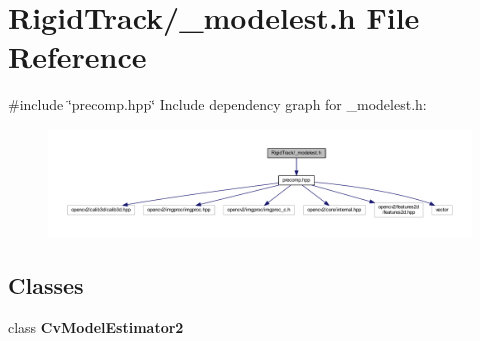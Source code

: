 \section{Rigid\+Track/\+\_\+modelest.h File Reference}
\label{__modelest_8h}
{\ttfamily \#include \char`\"{}precomp.\+hpp\char`\"{}}\newline
Include dependency graph for \+\_\+modelest.\+h\+:\nopagebreak
\begin{figure}[H]
\begin{center}
\leavevmode
\includegraphics[width=350pt]{__modelest_8h__incl}
\end{center}
\end{figure}
\subsection*{Classes}
\begin{DoxyCompactItemize}
\item 
class \textbf{ Cv\+Model\+Estimator2}
\end{DoxyCompactItemize}
